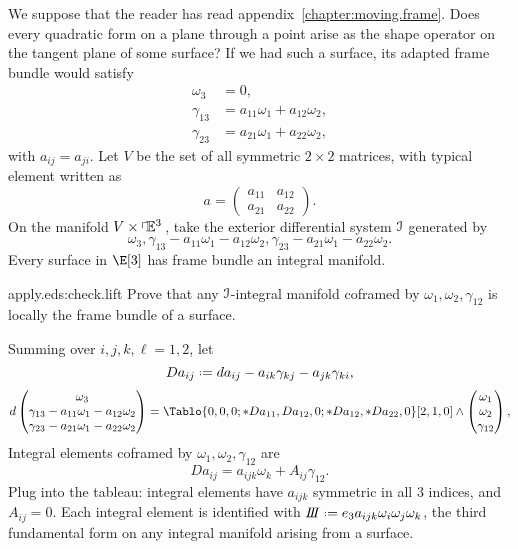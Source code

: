 
%
\label{section:surface.invariants}%
We suppose that the reader has read appendix~\ref{chapter:moving.frame}.
Does every quadratic form on a plane through a point arise as the shape operator on the tangent plane of some surface?
If we had such a surface, its adapted frame bundle would satisfy
\begin{align*}
\omega_3&=0,\\
\gamma_{13}&=a_{11}\omega_1+a_{12}\omega_2,\\
\gamma_{23}&=a_{21}\omega_1+a_{22}\omega_2,
\end{align*}
with \(a_{ij}=a_{ji}\).
Let \(V\) be the set of all symmetric \(2 \times 2\) matrices, with typical element written as
\[
a=
\begin{pmatrix}
a_{11} & a_{12} \\
a_{21} & a_{22}
\end{pmatrix}.
\]
On the manifold \(V \times \left\ulcorner\!\mathbb{E}^{3}\right.\), take the exterior differential system \(\mathcal{I}\) generated by 
\[
\omega_3,\gamma_{13}-a_{11}\omega_1-a_{12}\omega_2,\gamma_{23}-a_{21}\omega_1-a_{22}\omega_2.
\]
Every surface in \(\E[3]\) has frame bundle an integral manifold.
\begin{problem}{apply.eds:check.lift}
Prove that any \(\mathcal{I}\)-integral manifold coframed by \(\omega_1,\omega_2,\gamma_{12}\) is locally the frame bundle of a surface.
\end{problem}
Summing over \(i,j,k,\ell=1,2\), let
\[
Da_{ij} \defeq da_{ij} -a_{ik}\gamma_{kj}-a_{jk}\gamma_{ki},
\]
\[
d
\begin{pmatrix}
\omega_3\\
\gamma_{13}-a_{11}\omega_1-a_{12}\omega_2\\
\gamma_{23}-a_{21}\omega_1-a_{22}\omega_2
\end{pmatrix}
=
\Tablo{0,0,0;*Da_{11},Da_{12},0;*Da_{12},*Da_{22},0}[2,1,0]
\wedge
\begin{pmatrix}
\omega_1\\
\omega_2\\
\gamma_{12}
\end{pmatrix},
\]
Integral elements coframed by \(\omega_1,\omega_2,\gamma_{12}\) are
\[
Da_{ij}=a_{ijk}\omega_k+A_{ij}\gamma_{12}.
\]
Plug into the tableau: integral elements have \(a_{ijk}\) symmetric in all \(3\) indices, and \(A_{ij}=0\).
Each integral element is identified with \(\thirdFundForm\defeq e_3 a_{ijk} \omega_i\omega_j\omega_k\), the third fundamental form on any integral manifold arising from a surface.
